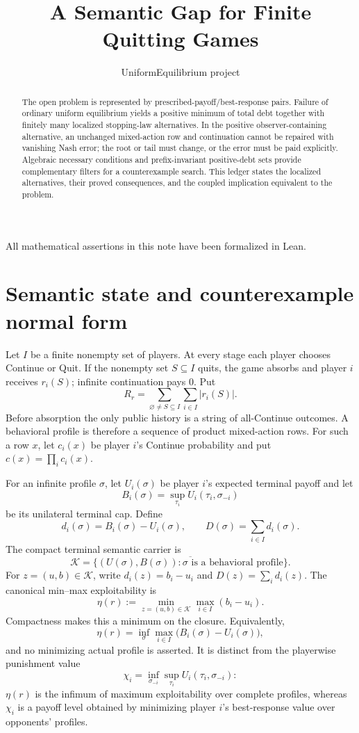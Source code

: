 \documentclass[11pt]{article}
\title{\vspace{-1.2cm}\textbf{A Semantic Gap for Finite Quitting Games}}
\author{UniformEquilibrium project}
\date{}
\newcommand{\K}{\mathcal K}
\begin{document}
\maketitle

\begin{abstract}
The open problem is represented by prescribed-payoff/best-response pairs.
Failure of ordinary uniform equilibrium yields a positive minimum of total
debt together with finitely many localized stopping-law alternatives.  In
the positive observer-containing alternative, an unchanged mixed-action row and continuation
cannot be repaired with vanishing Nash error; the root or tail must change,
or the error must be paid explicitly.  Algebraic necessary conditions and
prefix-invariant positive-debt sets provide complementary filters for a
counterexample search.  This ledger states the localized alternatives, their
proved consequences, and the coupled implication equivalent to the problem.
\end{abstract}

All mathematical assertions in this note have been formalized in Lean.

\section{Semantic state and counterexample normal form}

Let $I$ be a finite nonempty set of players.  At every stage each player
chooses Continue or Quit.  If the nonempty set $S\subseteq I$ quits, the game
absorbs and player $i$ receives $r_i(S)$; infinite continuation pays $0$.
Put
\[
 R_r=\sum_{\varnothing\ne S\subseteq I}\sum_{i\in I}|r_i(S)|.
\]
Before absorption the only public history is a string of all-Continue
outcomes.  A behavioral profile is therefore a sequence of product
mixed-action rows.  For such a row $x$, let $c_i(x)$ be player $i$'s
Continue probability and put $c(x)=\prod_i c_i(x)$.

For an infinite profile $\sigma$, let $U_i(\sigma)$ be player $i$'s expected
terminal payoff and let
\[
 B_i(\sigma)=\sup_{\tau_i}U_i(\tau_i,\sigma_{-i})
\]
be its unilateral terminal cap.  Define
\[
 d_i(\sigma)=B_i(\sigma)-U_i(\sigma),
 \qquad D(\sigma)=\sum_{i\in I}d_i(\sigma).
\]
The compact terminal semantic carrier is
\[
 \K=\overline{\{(U(\sigma),B(\sigma)):\sigma
       \text{ is a behavioral profile}\}}.
\]
For $z=(u,b)\in\K$, write $d_i(z)=b_i-u_i$ and
$D(z)=\sum_i d_i(z)$.
The canonical min--max exploitability is
\[
 \eta(r):=\min_{z=(u,b)\in\K}\max_{i\in I}(b_i-u_i).
\]
Compactness makes this a minimum on the closure.  Equivalently,
\[
 \eta(r)=\inf_\sigma\max_{i\in I}
   \bigl(B_i(\sigma)-U_i(\sigma)\bigr),
\]
and no minimizing actual profile is asserted.  It is distinct from the
playerwise punishment value
\[
 \chi_i=\inf_{\sigma_{-i}}\sup_{\tau_i}U_i(\tau_i,\sigma_{-i}):
\]
$\eta(r)$ is the infimum of maximum exploitability over complete profiles, whereas
$\chi_i$ is a payoff level obtained by minimizing player $i$'s best-response
value over opponents' profiles.
\end{document}
